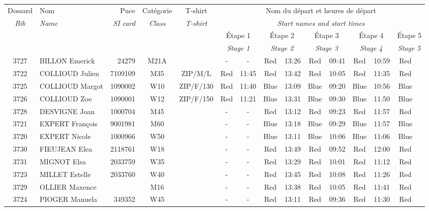 \documentclass{report}
\begin{document}
  \begin{longtable}{|c|l|r|c|c|*{5}{cc|}}
    Dossard & Nom  & Puce    & Catégorie & T-shirt & \multicolumn{10}{c|}{Nom du départ et heures de départ} \\
    \itshape Bib     & \itshape Name & \itshape SI card & \itshape Class  & \itshape  T-shirt  & \multicolumn{10}{c|}{\itshape Start names and start times} \\
    \hline
    & & & & & \multicolumn{2}{c|}{Étape 1} & \multicolumn{2}{c|}{Étape 2} & \multicolumn{2}{c|}{Étape 3} & \multicolumn{2}{c|}{Étape 4} & \multicolumn{2}{c|}{Étape 5} \\
    & & & & & \multicolumn{2}{c|}{\itshape Stage 1} & \multicolumn{2}{c|}{\itshape Stage 2} & \multicolumn{2}{c|}{\itshape Stage 3} & \multicolumn{2}{c|}{\itshape Stage 4} & \multicolumn{2}{c|}{\itshape Stage 5} \\
    \hline
    3727 & BILLON Emerick & 24279 & M21A &   & - &  - & Red & 13:26 & Red & 09:41 & Red & 10:59 & Red &  \\
    3722 & COLLIOUD Julien & 7109109 & M35 & ZIP/M/L & Red & 11:45 & Red & 13:42 & Red & 10:05 & Red & 11:35 & Red &  \\
    3725 & COLLIOUD Margot & 1090002 & W10 & ZIP/F/130 & Red & 11:40 & Blue & 13:09 & Blue & 09:20 & Blue & 10:56 & Blue &  \\
    3726 & COLLIOUD Zoe & 1090001 & W12 & ZIP/F/150 & Red & 11:21 & Blue & 13:31 & Blue & 09:30 & Blue & 11:50 & Blue &  \\
    3728 & DESVIGNE Joan & 1000704 & M45 &   & - &  - & Red & 13:12 & Red & 09:23 & Red & 11:57 & Red &  \\
    3721 & EXPERT François & 9001981 & M60 &   & - &  - & Blue & 13:18 & Blue & 09:29 & Blue & 11:57 & Blue &  \\
    3720 & EXPERT Nicole & 1000966 & W50 &   & - &  - & Blue & 13:11 & Blue & 10:06 & Blue & 11:06 & Blue &  \\
    3730 & FIEUJEAN Elea & 2118761 & W18 &   & - &  - & Red & 13:49 & Red & 09:52 & Red & 12:00 & Red &  \\
    3731 & MIGNOT Elsa & 2033759 & W35 &   & - &  - & Red & 13:29 & Red & 10:01 & Red & 11:12 & Red &  \\
    3723 & MILLET Estelle & 2033760 & W40 &   & - &  - & Red & 13:45 & Red & 10:08 & Red & 11:26 & Red &  \\
    3729 & OLLIER Maxence &  & M16 &   & - &  - & Red & 13:38 & Red & 10:05 & Red & 11:41 & Red &  \\
    3724 & PIOGER Manuela & 349352 & W45 &   & - &  - & Red & 13:11 & Red & 09:36 & Red & 11:30 & Red &  \\
  \end{longtable}
\end{document}
